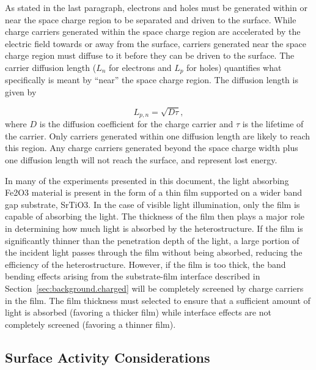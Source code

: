 \documentclass[12pt,%
              twoside,
               letterpaper]{uiothesis}
\begin{document}
As stated in the last paragraph, electrons and holes must be generated within or near the
space charge region to be separated and driven to the surface. While charge carriers
generated within the space charge region are accelerated by the electric field towards or
away from the surface, carriers generated near the space charge region must diffuse to it
before they can be driven to the surface.  The carrier diffusion length ($L_{n}$ for
electrons and $L_{p}$ for holes) quantifies what specifically is meant by ``near'' the
space charge region. The diffusion length is given by

\begin{equation}
	\label{fig:diffusionlength}
	L_{p,n}=\sqrt{D\tau},
\end{equation}
where $D$ is the diffusion coefficient for the charge carrier and $\tau$ is the lifetime
of the carrier. Only carriers generated within one diffusion length are likely to reach
this region. Any charge carriers generated beyond the space charge width plus one
diffusion length will not reach the surface, and represent lost energy. 

In many of the experiments presented in this document, the light absorbing Fe2O3
material is present in the form of a thin film supported on a wider band gap substrate,
SrTiO3. In the case of visible light illumination, only the film is capable of
absorbing the light. The thickness of the film then plays a major role in determining how
much light is absorbed by the heterostructure. If the film is significantly thinner than
the penetration depth of the light, a large portion of the incident light passes through
the film without being absorbed, reducing the efficiency of the heterostructure. However,
if the film is too thick, the band bending effects arising from the substrate-film
interface described in Section~\ref{sec:background.charged} will be completely screened by
charge carriers in the film. The film thickness must selected to ensure that a sufficient
amount of light is absorbed (favoring a thicker film) while interface effects are not
completely screened (favoring a thinner film).


\subsection{Surface Activity Considerations}
\label{subsec:background.surfaceactivity}
\end{document}
